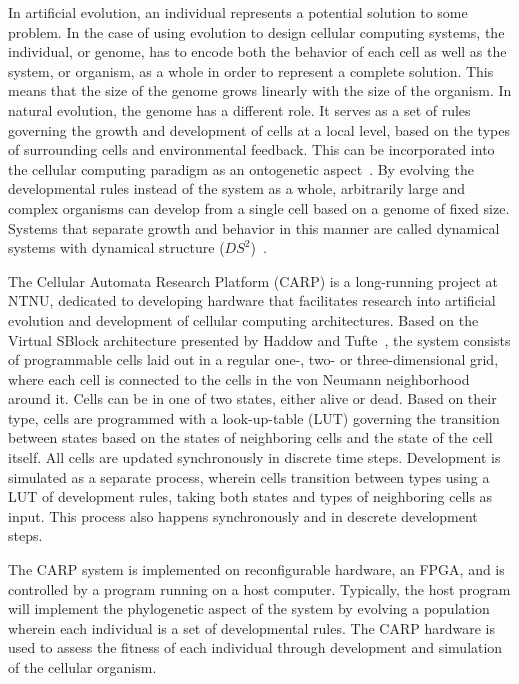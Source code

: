 In artificial evolution, an individual represents a potential solution to some
problem. In the case of using evolution to design cellular computing systems,
the individual, or genome, has to encode both the behavior of each cell as well
as the system, or organism, as a whole in order to represent a complete
solution. This means that the size of the genome grows linearly with the size of
the organism. In natural evolution, the genome has a different role. It serves
as a set of rules governing the growth and development of cells at a local
level, based on the types of surrounding cells and environmental feedback. This
can be incorporated into the cellular computing paradigm as an ontogenetic
aspect~\cite{Tufte2005a}. By evolving the developmental rules instead of the
system as a whole, arbitrarily large and complex organisms can develop from a
single cell based on a genome of fixed size. Systems that separate growth and
behavior in this manner are called dynamical systems with dynamical structure
($DS^2$)~\cite{Tufte2016}.

The Cellular Automata Research Platform (CARP) is a long-running project at
NTNU, dedicated to developing hardware that facilitates research into artificial
evolution and development of cellular computing architectures. Based on the
Virtual SBlock architecture presented by Haddow and Tufte~\cite{Haddow2000a},
the system consists of programmable cells laid out in a regular one-, two- or
three-dimensional grid, where each cell is connected to the cells in the von
Neumann neighborhood around it. Cells can be in one of two states, either alive
or dead. Based on their type, cells are programmed with a look-up-table (LUT)
governing the transition between states based on the states of neighboring cells
and the state of the cell itself. All cells are updated synchronously in
discrete time steps. Development is simulated as a separate process, wherein
cells transition between types using a LUT of development rules, taking both
states and types of neighboring cells as input. This process also happens
synchronously and in descrete development steps.

The CARP system is implemented on reconfigurable hardware, an FPGA, and is
controlled by a program running on a host computer. Typically, the host program
will implement the phylogenetic aspect of the system by evolving a population
wherein each individual is a set of developmental rules. The CARP hardware is
used to assess the fitness of each individual through development and simulation
of the cellular organism.

